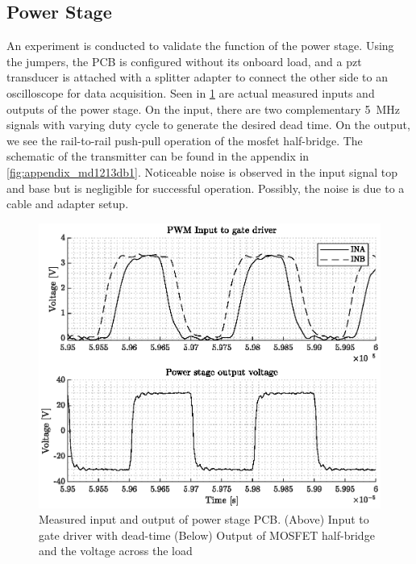 \subsection{Power Stage}
An experiment is conducted to validate the function of the power stage. Using the jumpers, the PCB is configured without its onboard load, and a \gls{pzt} transducer is attached with a splitter adapter to connect the other side to an oscilloscope for data acquisition. Seen in \cref{fig:4_transmitter_meas} are actual measured inputs and outputs of the power stage. On the input, there are two complementary \qty{5}{\mega\hertz} signals with varying duty cycle to generate the desired dead time. On the output, we see the rail-to-rail push-pull operation of the \gls{mosfet} half-bridge. The schematic of the transmitter can be found in the appendix in \cref{fig:appendix_md1213db1}. Noticeable noise is observed in the input signal top and base but is negligible for successful operation. Possibly, the noise is due to a cable and adapter setup.
\begin{figure}[htbp]
	\centering
	\includegraphics[width=.8\textwidth]{Figures/4_transmitter_pcb_out.eps}
	\caption[Measured input and output of power stage PCB]{Measured input and output of power stage PCB. (Above) Input to gate driver with dead-time (Below) Output of MOSFET half-bridge and the voltage across the load}
	\label{fig:4_transmitter_meas}
\end{figure}

